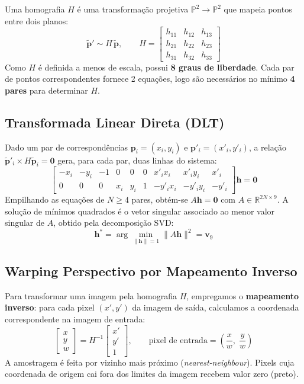 \documentclass[12pt,a4paper]{article}
\begin{document}
Uma homografia $H$ é uma transformação projetiva $\mathbb{P}^2\to\mathbb{P}^2$ que
mapeia pontos entre dois planos:
\begin{equation}
\tilde{\mathbf{p}}' \sim H\,\tilde{\mathbf{p}},\qquad
H = \begin{bmatrix}
  h_{11} & h_{12} & h_{13}\\
  h_{21} & h_{22} & h_{23}\\
  h_{31} & h_{32} & h_{33}
\end{bmatrix}
\end{equation}
Como $H$ é definida a menos de escala, possui \textbf{8 graus de liberdade}. Cada par
de pontos correspondentes fornece 2 equações, logo são necessários no mínimo
\textbf{4 pares} para determinar $H$.

\subsection{Transformada Linear Direta (DLT)}

Dado um par de correspondências $\mathbf{p}_i=(x_i,y_i)$ e
$\mathbf{p}'_i=(x'_i,y'_i)$, a relação
$\tilde{\mathbf{p}}'_i\times H\tilde{\mathbf{p}}_i=\mathbf{0}$ gera, para cada
par, duas linhas do sistema:
\begin{equation}
\begin{bmatrix}
-x_i & -y_i & -1 & 0 & 0 & 0 & x'_ix_i & x'_iy_i & x'_i\\
 0 & 0 & 0 & x_i & y_i & 1 & -y'_ix_i & -y'_iy_i & -y'_i
\end{bmatrix}
\mathbf{h} = \mathbf{0}
\end{equation}
Empilhando as equações de $N\geq4$ pares, obtém-se $A\mathbf{h}=\mathbf{0}$ com
$A\in\mathbb{R}^{2N\times9}$. A solução de mínimos quadrados é o vetor singular
associado ao menor valor singular de $A$, obtido pela decomposição SVD:
\begin{equation}
\mathbf{h}^* = \arg\min_{\|\mathbf{h}\|=1}\|A\mathbf{h}\|^2 = \mathbf{v}_9
\end{equation}

\subsection{Warping Perspectivo por Mapeamento Inverso}

Para transformar uma imagem pela homografia $H$, empregamos o
\textbf{mapeamento inverso}: para cada pixel $(x',y')$ da imagem de saída, calculamos
a coordenada correspondente na imagem de entrada:
\begin{equation}
\begin{bmatrix}x\\y\\w\end{bmatrix}
= H^{-1}\begin{bmatrix}x'\\y'\\1\end{bmatrix},
\qquad
\text{pixel de entrada} = \left(\frac{x}{w},\;\frac{y}{w}\right)
\end{equation}
A amostragem é feita por vizinho mais próximo (\textit{nearest-neighbour}). Pixels
cuja coordenada de origem cai fora dos limites da imagem recebem valor zero (preto).
\end{document}
